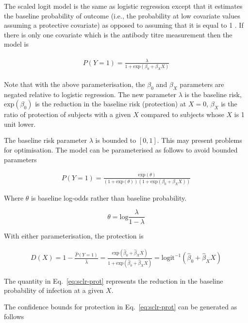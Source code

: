The scaled logit model is the same as logistic regression except that it estimates the baseline probability of outcome (i.e., the probability at low covariate values assuming a protective covariate) as opposed to assuming that it is equal to 1 \cite{Dunning;2006}. If there is only one covariate which is the antibody titre measurement then the model is

\begin{align*}
    \begin{gathered}
        P(Y=1) = \frac{\lambda}{1 + \text{exp}(\beta_0 + \beta_X X)}
    \end{gathered}
\end{align*}

Note that with the above parameterisation, the $\beta_0$ and $\beta_X$ parameters are negated relative to logistic regression. The new parameter $\lambda$ is the baseline risk, $\text{exp}(\beta_0)$ is the reduction in the baseline risk (protection) at $X=0$, $\beta_X$ is the ratio of protection of subjects with a given $X$ compared to subjects whose $X$ is 1 unit lower.

The baseline risk parameter $\lambda$ is bounded to $[0, 1]$. This may present problems for optimisation. The model can be parameterised as follows to avoid bounded parameters

\begin{gather*}
    P(Y=1) = \frac{\text{exp}(\theta)}{(1 + \text{exp}(\theta))(1 + \text{exp}(\beta_0 + \beta_X X))}
\end{gather*}

Where $\theta$ is baseline log-odds rather than baseline probability.

$$
    \theta = \text{log}\frac{\lambda}{1 - \lambda}
$$

With either parameterisation, the protection is

\begin{gather}
    D(X) = 1 - \frac{\hat{P}(Y=1)}{\hat{\lambda}} = \frac{\text{exp}(\hat{\beta}_0 + \hat{\beta}_X X)}{1 + \text{exp}(\hat{\beta}_0 + \hat{\beta}_X X)} = \text{logit}^{-1}(\hat{\beta}_0 + \hat{\beta}_X X)
    \label{eq:sclr-prot}
\end{gather}

The quantity in Eq.~\ref{eq:sclr-prot} represents the reduction in the baseline probability of infection at a given $X$.

The confidence bounds for protection in Eq.~\ref{eq:sclr-prot} can be generated as follows

